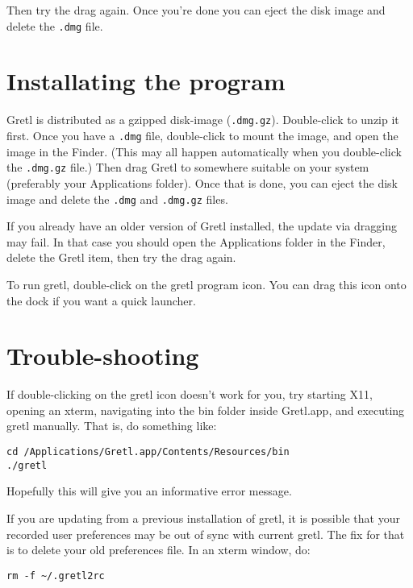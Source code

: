 \documentclass[11pt]{article}
\begin{document}
Then try the drag again. Once you're done you can eject the
disk image and delete the \texttt{.dmg} file.

\section{Installating the program}
\label{sec:install}

\textsf{Gretl} is distributed as a gzipped disk-image
(\texttt{.dmg.gz}).  Double-click to unzip it first.  Once you have a
\texttt{.dmg} file, double-click to mount the image, and open the
image in the Finder. (This may all happen automatically when you
double-click the \texttt{.dmg.gz} file.) Then drag \textsf{Gretl} to
somewhere suitable on your system (preferably your
\textsf{Applications} folder).  Once that is done, you can eject the
disk image and delete the \texttt{.dmg} and \texttt{.dmg.gz} files.

If you already have an older version of \textsf{Gretl} installed, the
update via dragging may fail. In that case you should open the
\textsf{Applications} folder in the Finder, delete the \textsf{Gretl}
item, then try the drag again.

To run gretl, double-click on the gretl program icon.  You can drag
this icon onto the dock if you want a quick launcher.

\section{Trouble-shooting}

If double-clicking on the gretl icon doesn't work for you, try
starting X11, opening an xterm, navigating into the \textsf{bin}
folder inside \textsf{Gretl.app}, and executing 
\textsf{gretl} manually.  That is, do something like:

\begin{verbatim}
cd /Applications/Gretl.app/Contents/Resources/bin
./gretl
\end{verbatim}

Hopefully this will give you an informative error message.

If you are updating from a previous installation of gretl, it
is possible that your recorded user preferences may be out of
sync with current gretl.  The fix for that is to delete
your old preferences file.  In an xterm window, do:

\begin{verbatim}
rm -f ~/.gretl2rc
\end{verbatim}
\end{document}
